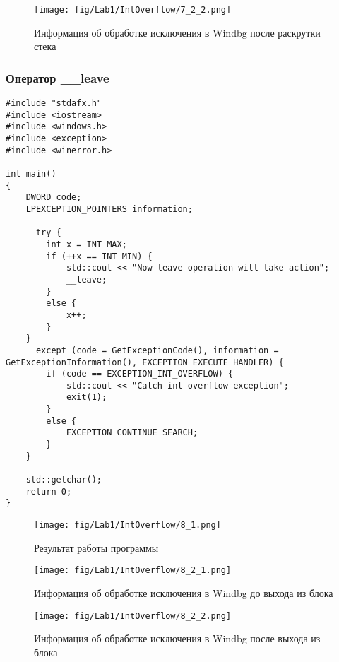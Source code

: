 \begin{figure}[H]
    \begin{center}
        \texttt{[image: fig/Lab1/IntOverflow/7\_2\_2.png]}
        \caption{Информация об обработке исключения в Windbg после раскрутки стека}
        \label{pic:7_2_2}
    \end{center}
\end{figure}

\subsubsection{Оператор \_\_leave}
\begin{lstlisting}[caption=Выход из блока с помозью оператора \_\_leave]
#include "stdafx.h"
#include <iostream>
#include <windows.h>
#include <exception>
#include <winerror.h>

int main()
{
    DWORD code;
    LPEXCEPTION_POINTERS information;

    __try {
        int x = INT_MAX;
        if (++x == INT_MIN) {
            std::cout << "Now leave operation will take action";
            __leave;
        }
        else {
            x++;
        }
    }
    __except (code = GetExceptionCode(), information = GetExceptionInformation(), EXCEPTION_EXECUTE_HANDLER) {
        if (code == EXCEPTION_INT_OVERFLOW) {
            std::cout << "Catch int overflow exception";
            exit(1);
        }
        else {
            EXCEPTION_CONTINUE_SEARCH;
        }
    }

    std::getchar();
    return 0;
}
\end{lstlisting}

\begin{figure}[H]
    \begin{center}
        \texttt{[image: fig/Lab1/IntOverflow/8\_1.png]}
        \caption{Результат работы программы}
        \label{pic:8_1}
    \end{center}
\end{figure}

\begin{figure}[H]
    \begin{center}
        \texttt{[image: fig/Lab1/IntOverflow/8\_2\_1.png]}
        \caption{Информация об обработке исключения в Windbg до выхода из блока}
        \label{pic:8_2_2}
    \end{center}
\end{figure}

\begin{figure}[H]
    \begin{center}
        \texttt{[image: fig/Lab1/IntOverflow/8\_2\_2.png]}
        \caption{Информация об обработке исключения в Windbg после выхода из блока}
        \label{pic:8_2_3}
    \end{center}
\end{figure}

